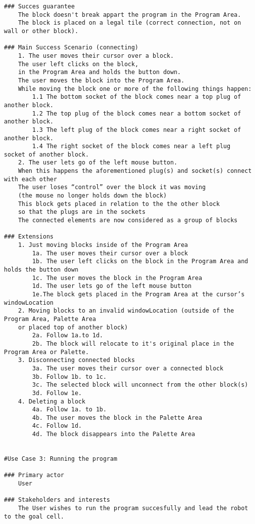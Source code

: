 \documentclass{article}
\begin{document}
\begin{verbatim}
### Succes guarantee
    The block doesn't break appart the program in the Program Area.
    The block is placed on a legal tile (correct connection, not on wall or other block).

### Main Success Scenario (connecting)
    1. The user moves their cursor over a block. 
    The user left clicks on the block, 
    in the Program Area and holds the button down. 
    The user moves the block into the Program Area.
    While moving the block one or more of the following things happen:
        1.1 The bottom socket of the block comes near a top plug of another block. 
        1.2 The top plug of the block comes near a bottom socket of another block.
        1.3 The left plug of the block comes near a right socket of another block.
        1.4 The right socket of the block comes near a left plug socket of another block. 
    2. The user lets go of the left mouse button. 
    When this happens the aforementioned plug(s) and socket(s) connect with each other
    The user loses “control” over the block it was moving
    (the mouse no longer holds down the block)
    This block gets placed in relation to the the other block 
    so that the plugs are in the sockets
    The connected elements are now considered as a group of blocks

### Extensions
    1. Just moving blocks inside of the Program Area
        1a. The user moves their cursor over a block
        1b. The user left clicks on the block in the Program Area and holds the button down
        1c. The user moves the block in the Program Area
        1d. The user lets go of the left mouse button 
        1e.The block gets placed in the Program Area at the cursor’s windowLocation
    2. Moving blocks to an invalid windowLocation (outside of the Program Area, Palette Area
    or placed top of another block)
        2a. Follow 1a.to 1d.
        2b. The block will relocate to it's original place in the Program Area or Palette.
    3. Disconnecting connected blocks
        3a. The user moves their cursor over a connected block
        3b. Follow 1b. to 1c.
        3c. The selected block will unconnect from the other block(s)
        3d. Follow 1e.
    4. Deleting a block
        4a. Follow 1a. to 1b.
        4b. The user moves the block in the Palette Area
        4c. Follow 1d.
        4d. The block disappears into the Palette Area
  
    
#Use Case 3: Running the program

### Primary actor
    User
    
### Stakeholders and interests
    The User wishes to run the program succesfully and lead the robot to the goal cell.


\end{verbatim}
\end{document}

